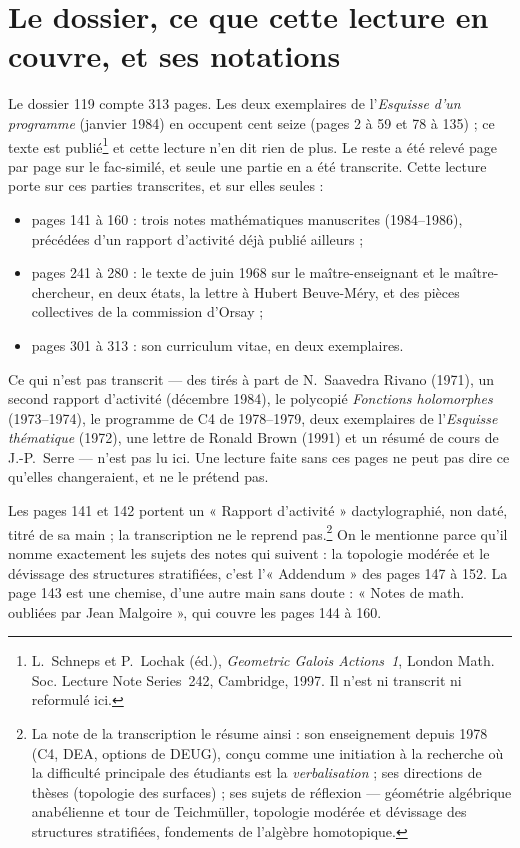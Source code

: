 \documentclass[11pt,a4paper]{article}
\begin{document}
\section*{Le dossier, ce que cette lecture en couvre, et ses notations}

Le dossier 119 compte 313 pages. Les deux exemplaires de l'\emph{Esquisse
d'un programme} (janvier 1984) en occupent cent seize (pages 2 à 59 et 78
à 135) ; ce texte est publié\footnote{L.~Schneps et P.~Lochak (éd.),
\emph{Geometric Galois Actions~1}, London Math. Soc. Lecture Note Series~242,
Cambridge, 1997. Il n'est ni transcrit ni reformulé ici.} et cette lecture
n'en dit rien de plus. Le reste a été relevé page par page sur le fac-similé,
et seule une partie en a été transcrite. Cette lecture porte sur ces parties
transcrites, et sur elles seules :

\begin{itemize}
\item pages 141 à 160 : trois notes mathématiques manuscrites
  (1984--1986), précédées d'un rapport d'activité déjà publié ailleurs ;
\item pages 241 à 280 : le texte de juin 1968 sur le maître-enseignant et le
  maître-chercheur, en deux états, la lettre à Hubert Beuve-Méry, et des
  pièces collectives de la commission d'Orsay ;
\item pages 301 à 313 : son curriculum vitae, en deux exemplaires.
\end{itemize}

Ce qui n'est pas transcrit — des tirés à part de N.~Saavedra Rivano (1971), un
second rapport d'activité (décembre 1984), le polycopié \emph{Fonctions
holomorphes} (1973--1974), le programme de C4 de 1978--1979, deux exemplaires
de l'\emph{Esquisse thématique} (1972), une lettre de Ronald Brown (1991) et un
résumé de cours de J.-P.~Serre — n'est pas lu ici. Une lecture faite sans ces
pages ne peut pas dire ce qu'elles changeraient, et ne le prétend pas.

Les pages 141 et 142 portent un « Rapport d'activité » dactylographié, non
daté, titré de sa main ; la transcription ne le reprend pas.\footnote{La note de la transcription le résume ainsi :
son enseignement depuis 1978 (C4, DEA, options de DEUG), conçu comme une
initiation à la recherche où la difficulté principale des étudiants est la
\emph{verbalisation} ; ses directions de thèses (topologie des surfaces) ;
ses sujets de réflexion — géométrie algébrique anabélienne et tour de
Teichmüller, topologie modérée et dévissage des structures stratifiées,
fondements de l'algèbre homotopique.} On le mentionne parce qu'il nomme
exactement les sujets des notes qui suivent : la topologie modérée et le
dévissage des structures stratifiées, c'est l'« Addendum » des pages 147
à 152. La page 143 est une chemise, d'une autre main sans doute : « Notes de
math. oubliées par Jean Malgoire », qui couvre les pages 144 à 160.
\end{document}
